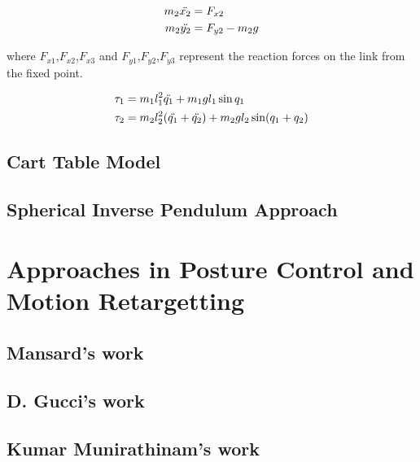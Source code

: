 \begin{equation}
\begin{split}
    m_2\Ddot{x_2} &= F_{x2} \\
    m_2\Ddot{y_2} &= F_{y2} - m_2g
\end{split}
\end{equation}

where $F_{x1}$,$F_{x2}$,$F_{x3}$ and $F_{y1}$,$F_{y2}$,$F_{y3}$ represent the reaction forces on the link from the fixed point.

\begin{equation}
\begin{split}
    \tau_1 &= m_1l_1^2\Ddot{q_1} + m_1gl_1\sin{q_1} \\
    \tau_2 &= m_2l_2^2 (\Ddot{q_1} + \Ddot{q_2}) + m_2gl_2\sin(q_1+q_2)
\end{split}
\end{equation}

\subsection{Cart Table Model}
\subsection{Spherical Inverse Pendulum Approach}

\section{Approaches in Posture Control and Motion Retargetting}
\subsection{Mansard's work}
\subsection{D. Gucci's work}
\subsection{Kumar Munirathinam's work}

